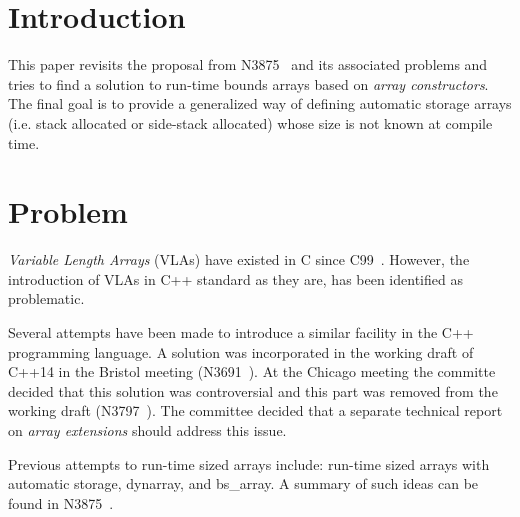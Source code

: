 \section{Introduction}

This paper revisits the proposal from N3875~\cite{n3875} and its associated
problems and tries to find a solution to run-time bounds arrays based on
\emph{array constructors}. The final goal is to provide a generalized way of
defining automatic storage arrays (i.e. stack allocated or side-stack allocated)
whose size is not known at compile time.

\section{Problem}

\emph{Variable Length Arrays} (VLAs) have existed in C since C99~\cite{c99}. However,
the introduction of VLAs in C++ standard as they are, has been identified as
problematic.

Several attempts have been made to introduce a similar facility in the C++
programming language. A solution was incorporated in the working draft of C++14
in the Bristol meeting (N3691~\cite{n3691}). At the Chicago meeting the committe
decided that this solution was controversial and this part was removed from the
working draft (N3797~\cite{n3797}). The committee decided that a separate
technical report on \emph{array extensions} should address this issue.

Previous attempts to run-time sized arrays include: run-time sized arrays with
automatic storage, dynarray, and bs\_array. A summary of such ideas can be found
in N3875~\cite{n3875}.

